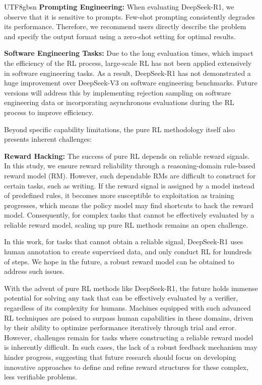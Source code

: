 \documentclass[11pt, a4paper, logo, copyright, nonumbering]{deepseek}
\begin{document}
\begin{CJK*}{UTF8}{gbsn}
 \textbf{Prompting Engineering:} When evaluating DeepSeek-R1, we observe that it is sensitive to prompts. Few-shot prompting consistently degrades its performance. Therefore, we recommend users directly describe the problem and specify the output format using a zero-shot setting for optimal results.
 
 \textbf{Software Engineering Tasks:}
Due to the long evaluation times, which impact the efficiency of the RL process, large-scale RL has not been applied extensively in software engineering tasks. As a result, DeepSeek-R1 has not demonstrated a huge improvement over DeepSeek-V3 on software engineering benchmarks. Future versions will address this by implementing rejection sampling on software engineering data or incorporating asynchronous evaluations during the RL process to improve efficiency.

Beyond specific capability limitations, the pure RL methodology itself also presents inherent challenges:

 \textbf{Reward Hacking:} The success of pure RL depends on reliable reward signals. In this study, we ensure reward reliability through a reasoning-domain rule-based reward model (RM). However, such dependable RMs are difficult to construct for certain tasks, such as writing. If the reward signal is assigned by a model instead of predefined rules, it becomes more susceptible to exploitation as training progresses, which means the policy model may find shortcuts to hack the reward model. Consequently, for complex tasks that cannot be effectively evaluated by a reliable reward model, scaling up pure RL methods remains an open challenge.

In this work, for tasks that cannot obtain a reliable signal, DeepSeek-R1 uses human annotation to create supervised data, and only conduct RL for hundreds of steps. We hope in the future, a robust reward model can be obtained to address such issues. 

With the advent of pure RL methods like DeepSeek-R1, the future holds immense potential for solving any task that can be effectively evaluated by a verifier, regardless of its complexity for humans. Machines equipped with such advanced RL techniques are poised to surpass human capabilities in these domains, driven by their ability to optimize performance iteratively through trial and error. However, challenges remain for tasks where constructing a reliable reward model is inherently difficult. In such cases, the lack of a robust feedback mechanism may hinder progress, suggesting that future research should focus on developing innovative approaches to define and refine reward structures for these complex, less verifiable problems.


\end{CJK*}
\end{document}
